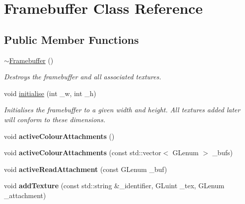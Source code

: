 \hypertarget{class_framebuffer}{}\section{Framebuffer Class Reference}
\label{class_framebuffer}
\subsection*{Public Member Functions}
\begin{DoxyCompactItemize}
\item 
\hypertarget{class_framebuffer_a037bf3e17455354d5d907ceea00313dd}{}\hyperlink{class_framebuffer_a037bf3e17455354d5d907ceea00313dd}{$\sim$\+Framebuffer} ()\label{class_framebuffer_a037bf3e17455354d5d907ceea00313dd}

\begin{DoxyCompactList}\small\item\em Destroys the framebuffer and all associated textures. \end{DoxyCompactList}\item 
\hypertarget{class_framebuffer_a42333b68b7a236213c847c67f565757a}{}void \hyperlink{class_framebuffer_a42333b68b7a236213c847c67f565757a}{initialise} (int \+\_\+w, int \+\_\+h)\label{class_framebuffer_a42333b68b7a236213c847c67f565757a}

\begin{DoxyCompactList}\small\item\em Initialises the framebuffer to a given width and height. All textures added later will conform to these dimensions. \end{DoxyCompactList}\item 
\hypertarget{class_framebuffer_ac6cbf17aec474eeea93606b74a0edae3}{}void {\bfseries active\+Colour\+Attachments} ()\label{class_framebuffer_ac6cbf17aec474eeea93606b74a0edae3}

\item 
\hypertarget{class_framebuffer_a0a1ca4ce2d650f2605c4ac67b117b43b}{}void {\bfseries active\+Colour\+Attachments} (const std\+::vector$<$ G\+Lenum $>$ \+\_\+bufs)\label{class_framebuffer_a0a1ca4ce2d650f2605c4ac67b117b43b}

\item 
\hypertarget{class_framebuffer_a16ab496a93c687f1ee7b95a629b19bd2}{}void {\bfseries active\+Read\+Attachment} (const G\+Lenum \+\_\+buf)\label{class_framebuffer_a16ab496a93c687f1ee7b95a629b19bd2}

\item 
\hypertarget{class_framebuffer_a268363c1d77db0580a5c409fb1fc6720}{}void {\bfseries add\+Texture} (const std\+::string \&\+\_\+identifier, G\+Luint \+\_\+tex, G\+Lenum \+\_\+attachment)\label{class_framebuffer_a268363c1d77db0580a5c409fb1fc6720}


\end{DoxyCompactItemize}
